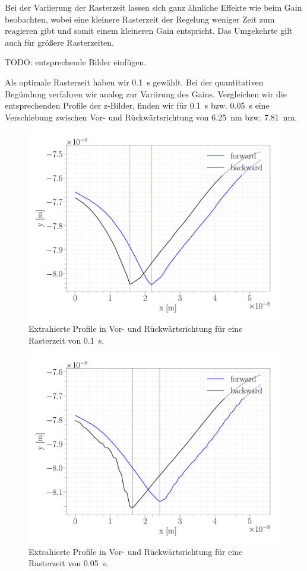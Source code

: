 Bei der Variierung der Rasterzeit lassen sich ganz ähnliche Effekte wie beim Gain beobachten, wobei eine kleinere Rasterzeit der Regelung weniger Zeit zum reagieren gibt und somit einem kleineren Gain entspricht. Das Umgekehrte gilt auch für größere Rasterzeiten.


TODO: entsprechende Bilder einfügen.


Als optimale Rasterzeit haben wir \SI{0,1}{s} gewählt. Bei der quantitativen Begündung verfahren wir analog zur Variirung des Gains. Vergleichen wir die entsprechenden Profile der z-Bilder, finden wir für \SI{0,1}{s} bzw. \SI{0,05}{s} eine Verschiebung zwischen Vor- und Rückwärtsrichtung von \SI{6,25}{nm} bzw. \SI{7,81}{nm}.

\begin{figure}[H]
\centering
\includegraphics[width=\textwidth]{../Figures/TIME_01_profile.pdf}
\caption{Extrahierte Profile in Vor- und Rückwärtsrichtung für eine Rasterzeit von \SI{0.1}{s}.}
\label{TIME_01_profile}
\end{figure}

\begin{figure}[H]
\centering
\includegraphics[width=\textwidth]{../Figures/TIME_005_profile.pdf}
\caption{Extrahierte Profile in Vor- und Rückwärtsrichtung für eine Rasterzeit von \SI{0.05}{s}.}
\label{TIME_005_profile}
\end{figure}


